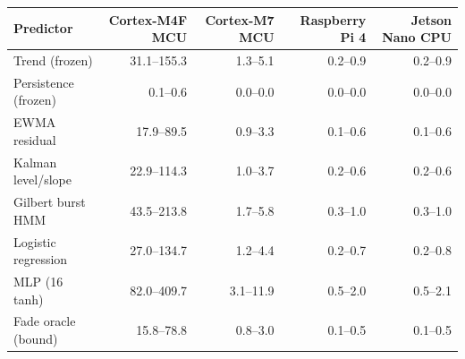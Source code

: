 \begin{tabular}{lrrrr}\toprule
Predictor & Cortex-M4F MCU & Cortex-M7 MCU & Raspberry Pi 4 & Jetson Nano CPU\\\midrule
Trend (frozen) & 31.1--155.3 & 1.3--5.1 & 0.2--0.9 & 0.2--0.9\\
Persistence (frozen) & 0.1--0.6 & 0.0--0.0 & 0.0--0.0 & 0.0--0.0\\
EWMA residual & 17.9--89.5 & 0.9--3.3 & 0.1--0.6 & 0.1--0.6\\
Kalman level/slope & 22.9--114.3 & 1.0--3.7 & 0.2--0.6 & 0.2--0.6\\
Gilbert burst HMM & 43.5--213.8 & 1.7--5.8 & 0.3--1.0 & 0.3--1.0\\
Logistic regression & 27.0--134.7 & 1.2--4.4 & 0.2--0.7 & 0.2--0.8\\
MLP (16 tanh) & 82.0--409.7 & 3.1--11.9 & 0.5--2.0 & 0.5--2.1\\
Fade oracle (bound) & 15.8--78.8 & 0.8--3.0 & 0.1--0.5 & 0.1--0.5\\
\bottomrule\end{tabular}

